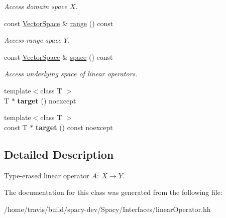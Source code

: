 \begin{DoxyCompactItemize}
\begin{DoxyCompactList}\small\item\em Access domain space $X$. \end{DoxyCompactList}\item 
\hypertarget{classSpacy_1_1LinearOperator_a29653883e8ebc3460e9294e3bceee5bf}{const \hyperlink{classSpacy_1_1VectorSpace}{Vector\-Space} \& \hyperlink{classSpacy_1_1LinearOperator_a29653883e8ebc3460e9294e3bceee5bf}{range} () const }\label{classSpacy_1_1LinearOperator_a29653883e8ebc3460e9294e3bceee5bf}

\begin{DoxyCompactList}\small\item\em Access range space $Y$. \end{DoxyCompactList}\item 
\hypertarget{classSpacy_1_1LinearOperator_ad0116ec957dfb6bc490a4c9702929f8e}{const \hyperlink{classSpacy_1_1VectorSpace}{Vector\-Space} \& \hyperlink{classSpacy_1_1LinearOperator_ad0116ec957dfb6bc490a4c9702929f8e}{space} () const }\label{classSpacy_1_1LinearOperator_ad0116ec957dfb6bc490a4c9702929f8e}

\begin{DoxyCompactList}\small\item\em Access underlying space of linear operators. \end{DoxyCompactList}\item 
\hypertarget{classSpacy_1_1LinearOperator_a74d3f8b5e058d6df4921f63c9023f01c}{{\footnotesize template$<$class T $>$ }\\T $\ast$ {\bfseries target} () noexcept}\label{classSpacy_1_1LinearOperator_a74d3f8b5e058d6df4921f63c9023f01c}

\item 
\hypertarget{classSpacy_1_1LinearOperator_a275563d8e433f8d714e84022f8f130a3}{{\footnotesize template$<$class T $>$ }\\const T $\ast$ {\bfseries target} () const noexcept}\label{classSpacy_1_1LinearOperator_a275563d8e433f8d714e84022f8f130a3}

\end{DoxyCompactItemize}


\subsection{Detailed Description}
Type-\/erased linear operator $A:\ X \to Y $. 

The documentation for this class was generated from the following file\-:\begin{DoxyCompactItemize}
\item 
/home/travis/build/spacy-\/dev/\-Spacy/\-Interfaces/linear\-Operator.\-hh\end{DoxyCompactItemize}
